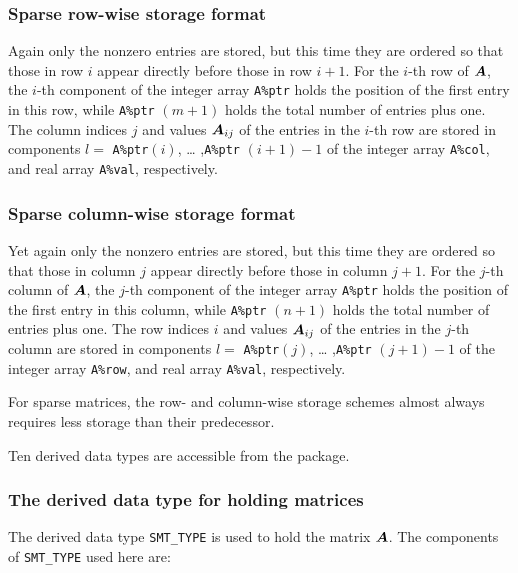 \documentclass{galahad}
\begin{document}
\subsubsection{Sparse row-wise storage format}\label{rowwise}
Again only the nonzero entries are stored, but this time they are
ordered so that those in row $i$ appear directly before those in row
$i+1$. For the $i$-th row of ${\bm{A}}$, the $i$-th component of the integer
array {\tt A\%ptr} holds the position of the first entry in this row,
while {\tt A\%ptr} $(m+1)$ holds the total number of entries plus one.
The column indices $j$ and values ${\bm{A}}_{ij}$ of the entries in the
$i$-th row are stored in components $l =$ {\tt A\%ptr}$(i)$, \ldots
,{\tt A\%ptr} $(i+1)-1$ of the integer array {\tt A\%col}, and real
array {\tt A\%val}, respectively.

\subsubsection{Sparse column-wise storage format}\label{columnwise}
Yet again only the nonzero entries are stored, but this time they are
ordered so that those in column $j$ appear directly before those in column
$j+1$. For the $j$-th column of ${\bm{A}}$, the $j$-th component of the integer
array {\tt A\%ptr} holds the position of the first entry in this column,
while {\tt A\%ptr} $(n+1)$ holds the total number of entries plus one.
The row indices $i$ and values ${\bm{A}}_{ij}$ of the entries in the
$j$-th column are stored in components $l =$ {\tt A\%ptr}$(j)$, \ldots
,{\tt A\%ptr} $(j+1)-1$ of the integer array {\tt A\%row}, and real
array {\tt A\%val}, respectively.

For sparse matrices, the row- and column-wise storage schemes almost always
requires less storage than their predecessor.





\galtypes
Ten derived data types are accessible from the package.


\subsubsection{The derived data type for holding matrices}\label{typesmt}
The derived data type {\tt SMT\_TYPE} is used to hold the matrix ${\bm{A}}$.
The components of {\tt SMT\_TYPE} used here are:
\end{document}
